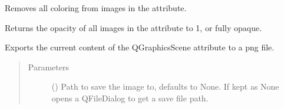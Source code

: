 \documentclass[letterpaper,10pt,english]{sphinxmanual}
\begin{document}
\begin{fulllineitems}
\begin{fulllineitems}
\label{\detokenize{polo.widgets:polo.widgets.plate_viewer.plateViewer.decolor_all_images}}
Removes all coloring from images in the  attribute.

\end{fulllineitems}


\begin{fulllineitems}
\label{\detokenize{polo.widgets:polo.widgets.plate_viewer.plateViewer.emphasize_all_images}}
Returns the opacity of all images in the  attribute
to 1, or fully opaque.

\end{fulllineitems}


\begin{fulllineitems}
\label{\detokenize{polo.widgets:polo.widgets.plate_viewer.plateViewer.export_current_view}}
Exports the current content of the QGraphicsScene  attribute
to a png file.
\begin{quote}\begin{description}
\item[{Parameters}] \leavevmode
{} (\sphinxstyleliteralemphasis{\sphinxupquote{, }}) \textendash{} Path to save the image to, defaults to None. If kept 
as None opens a QFileDialog to get a save file path.

\end{description}\end{quote}

\end{fulllineitems}


\end{fulllineitems}
\end{document}
